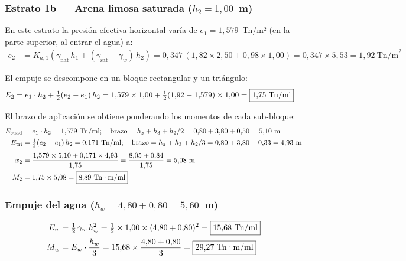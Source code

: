 \subsubsection{Estrato 1b — Arena limosa saturada ($h_2 = 1{,}00$~m)}

En este estrato la presión efectiva horizontal varía de $e_1 = 1{,}579$~Tn/m² (en la
parte superior, al entrar el agua) a:
\begin{align*}
  e_2 &= K_{a,1}\!\left(\gamma_\text{nat}\,h_1
        + (\gamma_\text{sat} - \gamma_w)\,h_2\right)
       = 0{,}347\,(1{,}82 \times 2{,}50 + 0{,}98 \times 1{,}00)
       = 0{,}347 \times 5{,}53 = 1{,}92~\text{Tn/m}^2
\end{align*}

El empuje se descompone en un bloque rectangular y un triángulo:
\begin{align*}
  E_2 &= e_1 \cdot h_2 + \tfrac{1}{2}(e_2 - e_1)\,h_2
        = 1{,}579 \times 1{,}00 + \tfrac{1}{2}(1{,}92 - 1{,}579)\times 1{,}00
        = \boxed{1{,}75~\text{Tn/ml}}
\end{align*}

El brazo de aplicación se obtiene ponderando los momentos de cada sub-bloque:
\begin{align*}
  E_\text{cuad} &= e_1 \cdot h_2 = 1{,}579~\text{Tn/ml};
    \quad \text{brazo} = h_z + h_3 + h_2/2 = 0{,}80 + 3{,}80 + 0{,}50 = 5{,}10~\text{m}\\
  E_\text{tri}  &= \tfrac{1}{2}(e_2-e_1)\,h_2 = 0{,}171~\text{Tn/ml};
    \quad \text{brazo} = h_z + h_3 + h_2/3 = 0{,}80 + 3{,}80 + 0{,}33 = 4{,}93~\text{m}\\[4pt]
  x_2 &= \frac{1{,}579\times5{,}10 + 0{,}171\times4{,}93}{1{,}75}
        = \frac{8{,}05 + 0{,}84}{1{,}75} = 5{,}08~\text{m}\\
  M_2 &= 1{,}75 \times 5{,}08 = \boxed{8{,}89~\text{Tn·m/ml}}
\end{align*}

\subsubsection{Empuje del agua ($h_w = 4{,}80 + 0{,}80 = 5{,}60$~m)}

\begin{align*}
  E_w &= \tfrac{1}{2}\,\gamma_w\,h_w^2
        = \tfrac{1}{2} \times 1{,}00 \times (4{,}80+0{,}80)^2
        = \boxed{15{,}68~\text{Tn/ml}} \\
  M_w &= E_w \cdot \frac{h_w}{3}
        = 15{,}68 \times \frac{4{,}80+0{,}80}{3}
        = \boxed{29{,}27~\text{Tn·m/ml}}
\end{align*}

